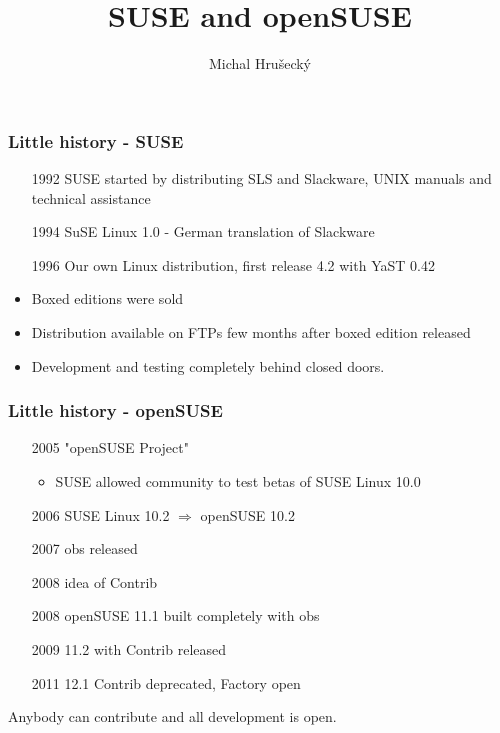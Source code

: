 \documentclass{beamer}
\author{Michal Hru\v{s}eck\'{y}}
\title{SUSE and openSUSE}
\institute{openSUSE Team}
\begin{document}
\titlepage

\begin{frame}[t]
\frametitle{Little history - SUSE}

\begin{itemize}
\item[1992] SUSE started by distributing SLS and Slackware, UNIX manuals and technical assistance
\item[1994] SuSE Linux 1.0 - German translation of Slackware
\item[1996] Our own Linux distribution, first release 4.2 with YaST 0.42
\end{itemize}

\vspace{.5cm}

\begin{itemize}
\item Boxed editions were sold
\item Distribution available on FTPs few months after boxed edition released
\item Development and testing completely behind closed doors.
\end{itemize}

\end{frame}

\begin{frame}[t]
\frametitle{Little history - openSUSE}

\begin{itemize}
\item[2005] "openSUSE Project"
\begin{itemize}
\item SUSE allowed community to test betas of SUSE Linux 10.0
\end{itemize}
\item[2006] SUSE Linux 10.2 \(\Rightarrow\) openSUSE 10.2
\item[2007] obs released
\item[2008] idea of Contrib
\item[2008] openSUSE 11.1 built completely with obs
\item[2009] 11.2 with Contrib released
\item[2011] 12.1 Contrib deprecated, Factory open
\end{itemize}

\vspace{.5cm}

Anybody can contribute and all development is open.

\end{frame}
\end{document}
